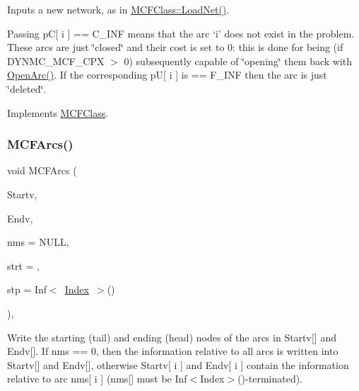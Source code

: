 Inputs a new network, as in \mbox{\hyperlink{class_m_c_f_class_a8d82d26f7845eb69081c860e14c3dc4c}{M\+C\+F\+Class\+::\+Load\+Net()}}.

Passing pC\mbox{[} i \mbox{]} == C\+\_\+\+I\+NF means that the arc `i' does not exist in the problem. These arcs are just \char`\"{}closed\char`\"{} and their cost is set to 0\+: this is done for being (if D\+Y\+N\+M\+C\+\_\+\+M\+C\+F\+\_\+\+C\+PX $>$ 0) subsequently capable of \char`\"{}opening\char`\"{} them back with \mbox{\hyperlink{class_m_c_f_cplex_af8adf5d3a1f9dfb9c2dd30c170663136}{Open\+Arc()}}. If the corresponding pU\mbox{[} i \mbox{]} is == F\+\_\+\+I\+NF then the arc is just \char`\"{}deleted\char`\"{}. 

Implements \mbox{\hyperlink{class_m_c_f_class_a8d82d26f7845eb69081c860e14c3dc4c}{M\+C\+F\+Class}}.

\mbox{\label{class_m_c_f_cplex_ae06f34c21f0b08a677f6af83f7c41fd0}} 
\subsubsection{\texorpdfstring{M\+C\+F\+Arcs()}{MCFArcs()}}
{\footnotesize\ttfamily void M\+C\+F\+Arcs (\begin{DoxyParamCaption}\item[{\mbox{\hyperlink{class_m_c_f_class_ace3388eb329ff0551a0b86b6c67e33d8}{Index\+\_\+\+Set}}}]{Startv,  }\item[{\mbox{\hyperlink{class_m_c_f_class_ace3388eb329ff0551a0b86b6c67e33d8}{Index\+\_\+\+Set}}}]{Endv,  }\item[{\mbox{\hyperlink{class_m_c_f_class_a81575b2d4e4d5636b17170432150ae69}{c\+Index\+\_\+\+Set}}}]{nms = {\ttfamily NULL},  }\item[{\mbox{\hyperlink{class_m_c_f_class_a76aaabb20535c51a2752b93f6c38fe54}{c\+Index}}}]{strt = {},  }\item[{\mbox{\hyperlink{class_m_c_f_class_ad53d6229d7ec28555a9c9c2fd9abf773}{Index}}}]{stp = {\ttfamily Inf$<$~\mbox{\hyperlink{class_m_c_f_class_ad53d6229d7ec28555a9c9c2fd9abf773}{Index}}~$>$()} }\end{DoxyParamCaption})\hspace{0.3cm}{\ttfamily [override]}, {\ttfamily [virtual]}}

Write the starting (tail) and ending (head) nodes of the arcs in Startv\mbox{[}\mbox{]} and Endv\mbox{[}\mbox{]}. If nms == 0, then the information relative to all arcs is written into Startv\mbox{[}\mbox{]} and Endv\mbox{[}\mbox{]}, otherwise Startv\mbox{[} i \mbox{]} and Endv\mbox{[} i \mbox{]} contain the information relative to arc nms\mbox{[} i \mbox{]} (nms\mbox{[}\mbox{]} must be Inf$<$\+Index$>$()-\/terminated).

